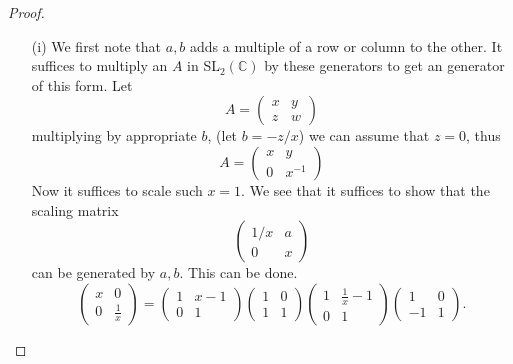 \documentclass[openany]{book}
\newcommand{\C}{\mathbb{C}}
\begin{document}
\begin{proof}
    \begin{enumerate}
        \item[(i)] We first note that $a,b$ adds a multiple of a row or column to the other. It suffices to multiply an $A$ in SL$_2(\C)$ by these generators to get an generator of this form. Let 
        \begin{equation*}
            A=\begin{pmatrix}
                x & y \\
                z & w
                \end{pmatrix}
        \end{equation*}
        multiplying by appropriate $b$, (let $b=-z/x$) we can assume that $z=0$, thus 
        \begin{equation*}
            A=\begin{pmatrix}
                x & y \\
                0 & x^{-1} 
                \end{pmatrix}
        \end{equation*} 
        Now it suffices to scale such $x=1$. We see that it suffices to show that the scaling matrix 
        \begin{equation*}
            \begin{pmatrix}
                1/x & a \\
                0 & x 
                \end{pmatrix}
        \end{equation*}
        can be generated by $a,b$. This can be done.
        \[
\begin{pmatrix}
x & 0 \\
0 & \frac{1}{x}
\end{pmatrix}
=
\begin{pmatrix}
1 & x - 1 \\
0 & 1
\end{pmatrix}
\begin{pmatrix}
1 & 0 \\
1 & 1
\end{pmatrix}
\begin{pmatrix}
1 & \frac{1}{x} - 1 \\
0 & 1
\end{pmatrix}
\begin{pmatrix}
1 & 0 \\
-1 & 1
\end{pmatrix}.
\]
    

\end{enumerate}
\end{proof}
\end{document}
